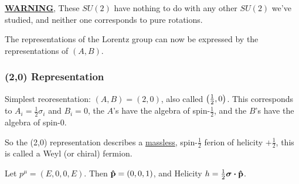 \begin{remark}
  \underline{\bf WARNING}, These $SU(2)$ have nothing to do with any other $SU(2)$ we've studied, and neither one corresponds to pure rotations. 
\end{remark}

The representations of the Lorentz group can now be expressed by the representations of $(A,B)$.

\subsubsection{(2,0) Representation}
Simplest reoresentation: $(A,B)=(2,0)$, also called $\qty(\frac12,0)$. This corresponds to $A_i=\frac12\sigma_i$ and $B_i=0$, the $A$'s have the algebra of spin-$\frac12$, and the $B$'s have the algebra of spin-0.

So the (2,0) representation describes a \underline{massless}, spin-$\frac12$ ferion of helicity $+\frac12$, this is called a Weyl (or chiral) fermion.

Let $p^\mu=(E,0,0,E)$. Then $\vu{p}=(0,0,1)$, and Helicity $h=\frac12\bm{\sigma}\vdot\vu{p}$.

